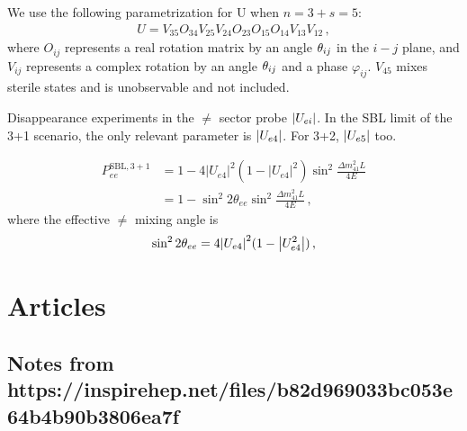 \documentclass[twocolumn]{article}
\begin{document}
We use the following parametrization for U when $n = 3+s = 5$:
\begin{align*}
  U=V_{35} O_{34} V_{25} V_{24} O_{23} O_{15} O_{14} V_{13} V_{12}
\,,\end{align*}
where $O_{ij}$ represents a real rotation matrix by an angle $\th_{ij}$ in the $i-j$ plane, and $V_{ij}$ represents a complex rotation by an angle $\th_{ij}$ and a phase $\varphi_{ij}$. $V_{45}$ mixes sterile states and is unobservable and not included. 

Disappearance experiments in the $\ne$ sector probe $\abs{U_{ei}}$. In the SBL limit of the 3+1 scenario, the only relevant parameter is $\abs{U_{e4}}$. For 3+2, $\abs{U_{e5}}$ too.

\begin{align*}
  P_{e e}^{\mathrm{SBL}, 3+1}
  &=1-4\left|U_{e 4}\right|^{2}\left(1-\left|U_{e 4}\right|^{2}\right) \sin ^{2} \frac{\Delta m_{41}^{2} L}{4 E} \\
  &=1-\sin ^{2} 2 \theta_{e e} \sin ^{2} \frac{\Delta m_{41}^{2} L}{4 E}
\,,\end{align*}
where the effective $\ne$ mixing angle is 
\begin{align*}
  \sin^2 2\theta_{ee} = 4 \abs{U_{e4}}^2(1 - \abs{U_{e4}^2})
\,,\end{align*}

\section*{Articles}
\subsection*{Notes from https://inspirehep.net/files/b82d969033bc053e64b4b90b3806ea7f}
\end{document}
